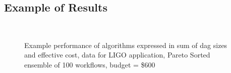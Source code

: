\documentclass[conference]{IEEEtran}
\begin{document}
\subsection{Example of Results}


\begin{figure}[tb]
    \centering
    \\
    \caption{Example performance of algorithms expressed in
    sum of dag sizes and effective cost, data for LIGO application, Pareto
    Sorted ensemble of 100 workflows, budget = \$600}
    \label{fig:size-cost}
\end{figure}

\end{document}
